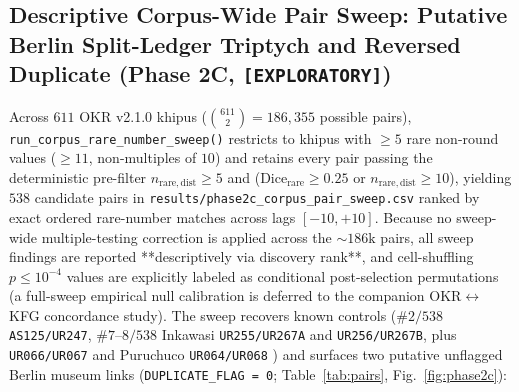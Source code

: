 \documentclass[11pt,a4paper]{article}
\begin{document}
\subsection{Descriptive Corpus-Wide Pair Sweep: Putative Berlin Split-Ledger Triptych and Reversed Duplicate (Phase 2C, \texttt{[EXPLORATORY]})}

Across $611$ OKR v2.1.0 khipus ($\binom{611}{2} = 186{,}355$ possible pairs), \texttt{run\_corpus\_rare\_number\_sweep()} restricts to khipus with $\ge 5$ rare non-round values ($\ge 11$, non-multiples of $10$) and retains every pair passing the deterministic pre-filter $n_{\mathrm{rare,dist}} \ge 5$ and ($\text{Dice}_{\mathrm{rare}} \ge 0.25$ or $n_{\mathrm{rare,dist}} \ge 10$), yielding $538$ candidate pairs in \texttt{results/phase2c\_corpus\_pair\_sweep.csv} ranked by exact ordered rare-number matches across lags $[-10, +10]$. Because no sweep-wide multiple-testing correction is applied across the $\sim 186\text{k}$ pairs, all sweep findings are reported **descriptively via discovery rank**, and cell-shuffling $p \le 10^{-4}$ values are explicitly labeled as conditional post-selection permutations (a full-sweep empirical null calibration is deferred to the companion OKR$\leftrightarrow$KFG concordance study). The sweep recovers known controls ($\#2/538$ \texttt{AS125/UR247}, $\#7\text{--}8/538$ Inkawasi \texttt{UR255/UR267A} and \texttt{UR256/UR267B}, plus \texttt{UR066/UR067} and Puruchuco \texttt{UR064/UR068} \citealt{urton2005khipu}) and surfaces two putative unflagged Berlin museum links (\texttt{DUPLICATE\_FLAG = 0}; Table~\ref{tab:pairs}, Fig.~\ref{fig:phase2c}):
\end{document}
